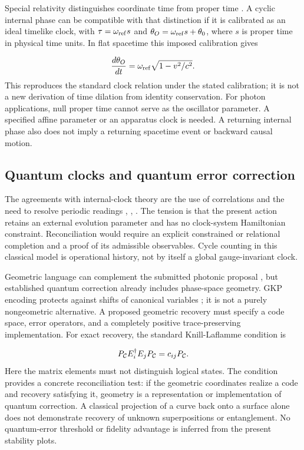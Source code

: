 \documentclass[aip,adv,preprint,floatfix]{revtex4-2}
\begin{document}
Special relativity distinguishes coordinate time from proper time \cite{r14}. A cyclic internal phase can be compatible with that distinction if it is calibrated as an ideal timelike clock, with $\tau=\omega_{\rm ref}s$ and $\theta_O=\omega_{\rm ref}s+\theta_0$, where $s$ is proper time in physical time units. In flat spacetime this imposed calibration gives

\begin{equation}
\frac{d\theta_O}{dt}=\omega_{\rm ref}\sqrt{1-v^2/c^2}.
\end{equation}
This reproduces the standard clock relation under the stated calibration; it is not a new derivation of time dilation from identity conservation. For photon applications, null proper time cannot serve as the oscillator parameter. A specified affine parameter or an apparatus clock is needed. A returning internal phase also does not imply a returning spacetime event or backward causal motion.

\subsection*{Quantum clocks and quantum error correction}
The agreements with internal-clock theory are the use of correlations and the need to resolve periodic readings \cite{r8}, \cite{r9}, \cite{r10}. The tension is that the present action retains an external evolution parameter and has no clock-system Hamiltonian constraint. Reconciliation would require an explicit constrained or relational completion and a proof of its admissible observables. Cycle counting in this classical model is operational history, not by itself a global gauge-invariant clock.

Geometric language can complement the submitted photonic proposal \cite{r5}, but established quantum correction already includes phase-space geometry. GKP encoding protects against shifts of canonical variables \cite{r15}; it is not a purely nongeometric alternative. A proposed geometric recovery must specify a code space, error operators, and a completely positive trace-preserving implementation. For exact recovery, the standard Knill-Laflamme condition \cite{r16} is

\begin{equation}
P_{\cal C}E_i^\dagger E_jP_{\cal C}=c_{ij}P_{\cal C}.
\end{equation}
Here the matrix elements must not distinguish logical states. The condition provides a concrete reconciliation test: if the geometric coordinates realize a code and recovery satisfying it, geometry is a representation or implementation of quantum correction. A classical projection of a curve back onto a surface alone does not demonstrate recovery of unknown superpositions or entanglement. No quantum-error threshold or fidelity advantage is inferred from the present stability plots.
\end{document}
